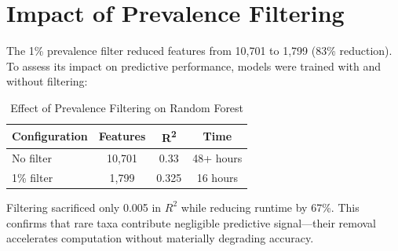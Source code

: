 \section{Impact of Prevalence Filtering}

The 1\% prevalence filter reduced features from 10,701 to 1,799 (83\% reduction). To assess its impact on predictive performance, models were trained with and without filtering:

\begin{table}[h]
\centering
\caption{Effect of Prevalence Filtering on Random Forest}
\label{tab:filtering}
\begin{tabular}{lccc}
\hline
\textbf{Configuration} & \textbf{Features} & \textbf{R\textsuperscript{2}} & \textbf{Time} \\
\hline
No filter & 10,701 & 0.33 & 48+ hours \\
1\% filter & 1,799 & 0.325 & 16 hours \\
\hline
\end{tabular}
\end{table}

Filtering sacrificed only 0.005 in $R^2$ while reducing runtime by 67\%. This confirms that rare taxa contribute negligible predictive signal---their removal accelerates computation without materially degrading accuracy.
